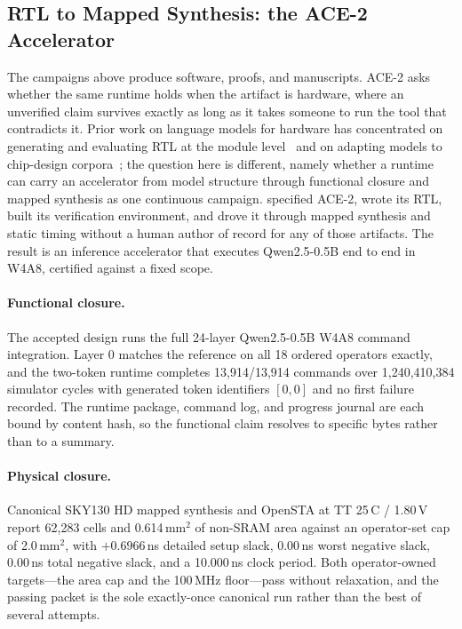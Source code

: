 \subsection{RTL to Mapped Synthesis: the ACE-2 Accelerator}
\label{sec:silicon-vertical}

The campaigns above produce software, proofs, and manuscripts. ACE-2 asks whether
the same runtime holds when the artifact is hardware, where an unverified claim
survives exactly as long as it takes someone to run the tool that contradicts it.
Prior work on language models for hardware has concentrated on generating and
evaluating RTL at the module level~\citep{liu2023verilogeval} and on adapting models
to chip-design corpora~\citep{liu2023chipnemo}; the question here is different,
namely whether a runtime can carry an accelerator from model structure through
functional closure and mapped synthesis as one continuous campaign.
\systemname specified ACE-2, wrote its RTL, built its verification environment,
and drove it through mapped synthesis and static timing without a human author of
record for any of those artifacts. The result is an inference accelerator that
executes Qwen2.5-0.5B end to end in W4A8, certified against a fixed scope.

\paragraph{Functional closure.} The accepted design runs the full 24-layer
Qwen2.5-0.5B W4A8 command integration. Layer 0 matches the reference on all 18
ordered operators exactly, and the two-token runtime completes
13{,}914/13{,}914 commands over 1{,}240{,}410{,}384 simulator cycles with
generated token identifiers $[0,0]$ and no first failure recorded. The runtime
package, command log, and progress journal are each bound by content hash, so the
functional claim resolves to specific bytes rather than to a summary.

\paragraph{Physical closure.} Canonical SKY130 HD mapped synthesis and OpenSTA at
TT 25\,\textdegree C / 1.80\,V report 62{,}283 cells and 0.614\,mm$^2$ of
non-SRAM area against an operator-set cap of 2.0\,mm$^2$, with $+0.6966$\,ns
detailed setup slack, 0.00\,ns worst negative slack, 0.00\,ns total negative
slack, and a 10.000\,ns clock period. Both operator-owned targets---the area cap
and the 100\,MHz floor---pass without relaxation, and the passing packet is the
sole exactly-once canonical run rather than the best of several attempts.

